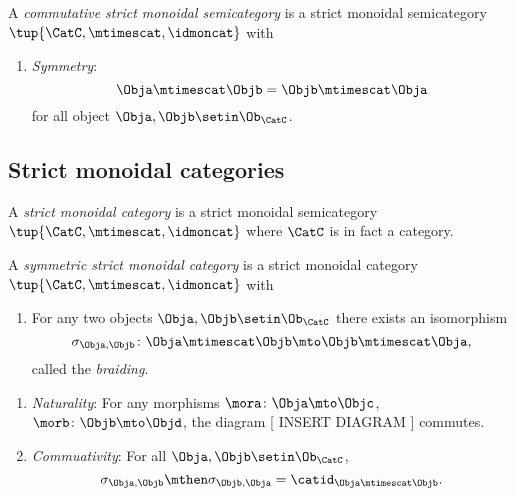 \begin{ctdefinition}
    \label{def:commutative-strict-monoidal}
    A \emph{commutative strict monoidal semicategory} is a strict monoidal semicategory  $\tup{\CatC, \mtimescat, \idmoncat}$ with

    \condit

    \begin{enumerate}
        \item \emph{Symmetry}:
              \begin{equation}
                  \Obja \mtimescat \Objb = \Objb \mtimescat \Obja
              \end{equation}
              for all object $\Obja, \Objb \setin \Ob_\CatC$.
    \end{enumerate}
\end{ctdefinition}


\subsection{Strict monoidal categories}

\begin{ctdefinition}
    \label{def:strict-monoidal-category}
    A \emph{strict monoidal category} is a strict monoidal semicategory $\tup{\CatC, \mtimescat, \idmoncat}$ where $\CatC$ is in fact a category.
\end{ctdefinition}

\begin{ctdefinition}
    \label{def:sym-strict-monoidal-semicat}
    A \emph{symmetric strict monoidal category} is a strict monoidal category $\tup{\CatC, \mtimescat, \idmoncat}$ with

    \constit

    \begin{enumerate}
        \item For any two objects $\Obja, \Objb \setin \Ob_\CatC$ there exists an isomorphism
              \begin{equation}
                  \sigma_{\Obja, \Objb} \colon \Obja \mtimescat   \Objb \mto \Objb \mtimescat   \Obja,
              \end{equation}
              called the \emph{braiding}.
    \end{enumerate}

    \condit

    \begin{enumerate}
        \item \emph{Naturality}: For any morphisms $\mora \colon \Obja \mto \Objc$, $\morb \colon \Objb \mto \Objd$, the diagram
                  [ INSERT DIAGRAM ]
              commutes.
        \item \emph{Commuativity}: For all $\Obja, \Objb \setin \Ob_\CatC$,
              \begin{equation}
                  \sigma_{\Obja, \Objb} \mthen \sigma_{\Objb, \Obja} = \catid_{\Obja \mtimescat   \Objb}.
              \end{equation}
    \end{enumerate}

\end{ctdefinition}



